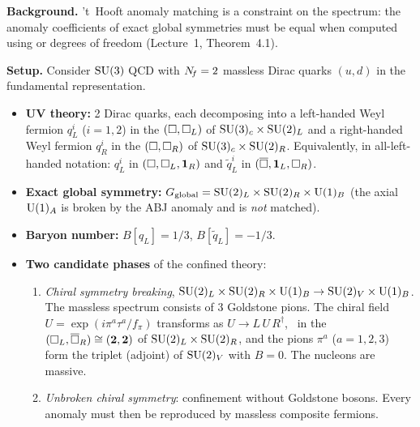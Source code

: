 \documentclass[11pt,a4paper]{article}
\begin{document}
\noindent\textbf{Background.}
't~Hooft anomaly matching is a constraint on the \IR{} spectrum: the
anomaly coefficients of exact global symmetries must be equal when computed
using \UV{} or \IR{} degrees of freedom (Lecture~1, Theorem~4.1).

\medskip
\noindent\textbf{Setup.}
Consider $\mathrm{SU}(3)$ QCD with $N_{\!f} = 2$ massless Dirac quarks $(u, d)$ in the
fundamental representation.

\begin{itemize}
  \item \textbf{UV theory:} 2 Dirac quarks, each decomposing into a
    left-handed Weyl fermion $q_L^i$ ($i=1,2$) in the $(\square, \square_L)$
    of $\mathrm{SU}(3)_c \times \mathrm{SU}(2)_L$ and a right-handed Weyl fermion
    $q_R^i$ in the $(\square, \square_R)$ of $\mathrm{SU}(3)_c \times \mathrm{SU}(2)_R$.
    Equivalently, in all-left-handed notation: $q_L^i$ in
    $(\square, \square_L, \mathbf{1}_R)$ and $\tilde{q}_L^i$ in
    $(\overline{\square}, \mathbf{1}_L, \square_R)$.
  \item \textbf{Exact global symmetry:}
    $G_{\text{global}} = \mathrm{SU}(2)_L \times \mathrm{SU}(2)_R \times \mathrm{U}(1)_B$
    (the axial $\mathrm{U}(1)_A$ is broken by the ABJ anomaly and is \emph{not}
    matched).
  \item \textbf{Baryon number:} $B[q_L] = 1/3$, $B[\tilde{q}_L] = -1/3$.
  \item \textbf{Two candidate \IR{} phases} of the confined theory:
    \begin{enumerate}[label=(\Roman*)]
      \item \emph{Chiral symmetry breaking},
        $\mathrm{SU}(2)_L \times \mathrm{SU}(2)_R \times \mathrm{U}(1)_B \to
        \mathrm{SU}(2)_V \times \mathrm{U}(1)_B$.  The massless spectrum consists of
        3 Goldstone pions.  The chiral field
        $U = \exp(i\pi^a\tau^a/f_\pi)$ transforms as
        $U \to L\,U\,R^\dagger$, \ie\ in the
        $(\square_L, \overline{\square}_R) \cong (\mathbf{2}, \mathbf{2})$ of
        $\mathrm{SU}(2)_L \times \mathrm{SU}(2)_R$, and the pions $\pi^a$ ($a = 1,2,3$)
        form the triplet (adjoint) of $\mathrm{SU}(2)_V$ with $B = 0$.  The
        nucleons are massive.
      \item \emph{Unbroken chiral symmetry}: confinement without
        Goldstone bosons.  Every anomaly must then be reproduced by
        massless composite fermions.
    \end{enumerate}
\end{itemize}
\end{document}
